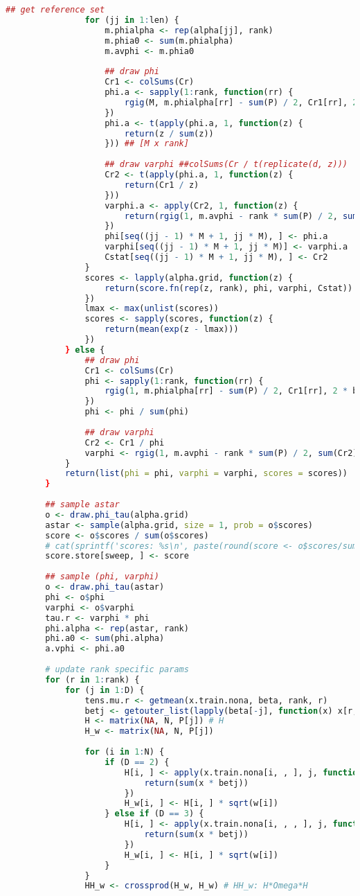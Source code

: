 \documentclass[AutoFakeBold]{LZUThesis}
\begin{document}
\begin{lstlisting}[language = R, caption = {BT-LR}算法]
				## get reference set
				for (jj in 1:len) {
					m.phialpha <- rep(alpha[jj], rank)
					m.phia0 <- sum(m.phialpha)
					m.avphi <- m.phia0
					
					## draw phi
					Cr1 <- colSums(Cr)
					phi.a <- sapply(1:rank, function(rr) {
						rgig(M, m.phialpha[rr] - sum(P) / 2, Cr1[rr], 2 * b.vphi)
					})
					phi.a <- t(apply(phi.a, 1, function(z) {
						return(z / sum(z))
					})) ## [M x rank]
					
					## draw varphi ##colSums(Cr / t(replicate(d, z)))
					Cr2 <- t(apply(phi.a, 1, function(z) {
						return(Cr1 / z)
					}))
					varphi.a <- apply(Cr2, 1, function(z) {
						return(rgig(1, m.avphi - rank * sum(P) / 2, sum(z), 2 * b.vphi))
					})
					phi[seq((jj - 1) * M + 1, jj * M), ] <- phi.a
					varphi[seq((jj - 1) * M + 1, jj * M)] <- varphi.a
					Cstat[seq((jj - 1) * M + 1, jj * M), ] <- Cr2
				}
				scores <- lapply(alpha.grid, function(z) {
					return(score.fn(rep(z, rank), phi, varphi, Cstat))
				})
				lmax <- max(unlist(scores))
				scores <- sapply(scores, function(z) {
					return(mean(exp(z - lmax)))
				})
			} else {
				## draw phi
				Cr1 <- colSums(Cr)
				phi <- sapply(1:rank, function(rr) {
					rgig(1, m.phialpha[rr] - sum(P) / 2, Cr1[rr], 2 * b.vphi)
				})
				phi <- phi / sum(phi)
				
				## draw varphi
				Cr2 <- Cr1 / phi
				varphi <- rgig(1, m.avphi - rank * sum(P) / 2, sum(Cr2), 2 * b.vphi)
			}
			return(list(phi = phi, varphi = varphi, scores = scores))
		}
		
		## sample astar
		o <- draw.phi_tau(alpha.grid)
		astar <- sample(alpha.grid, size = 1, prob = o$scores)
		score <- o$scores / sum(o$scores)
		# cat(sprintf('scores: %s\n', paste(round(score <- o$scores/sum(o$scores),2),collapse = ', ')))
		score.store[sweep, ] <- score
		
		## sample (phi, varphi)
		o <- draw.phi_tau(astar)
		phi <- o$phi
		varphi <- o$varphi
		tau.r <- varphi * phi
		phi.alpha <- rep(astar, rank)
		phi.a0 <- sum(phi.alpha)
		a.vphi <- phi.a0
		
		# update rank specific params
		for (r in 1:rank) {
			for (j in 1:D) {
				tens.mu.r <- getmean(x.train.nona, beta, rank, r)
				betj <- getouter_list(lapply(beta[-j], function(x) x[r, ]))
				H <- matrix(NA, N, P[j]) # H
				H_w <- matrix(NA, N, P[j])
				
				for (i in 1:N) {
					if (D == 2) {
						H[i, ] <- apply(x.train.nona[i, , ], j, function(x) {
							return(sum(x * betj))
						})
						H_w[i, ] <- H[i, ] * sqrt(w[i])
					} else if (D == 3) {
						H[i, ] <- apply(x.train.nona[i, , , ], j, function(x) {
							return(sum(x * betj))
						})
						H_w[i, ] <- H[i, ] * sqrt(w[i])
					}
				}
				HH_w <- crossprod(H_w, H_w) # HH_w: H*Omega*H
				

\end{lstlisting}
\end{document}
